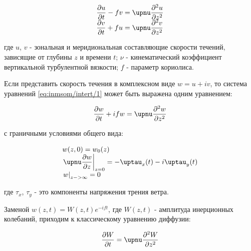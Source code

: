 \begin{equation} \label{eq:inmsom/intert/1} 
  \begin{array}{l}
  \displaystyle{ \d{u}{t} - fv = \nu \dd{u}{z} } \\ 
  \displaystyle{ \d{v}{t} + fu = \nu \dd{v}{z} } \\
  \end{array}
\end{equation}

где $u$, $v$ - зональная и меридиональная составляющие скорости течений, зависящие от глубины $z$ и времени $t$; $\nu$ - кинематический коэффициент вертикальной турбулентной вязкости; $f$ - параметр кориолиса. 

Если представить скорость течения в комплексном виде $w = u + iv $, то система уравнений \ref{eq:inmsom/intert/1} может быть выражена одним уравнением:

\begin{equation} \label{eq:inmsom/intert/2}
  \begin{array}{l}
  \displaystyle{  \d{w}{t} + ifw = \nu \dd{w}{z} } \\ 
  \end{array}
\end{equation}

с граничными условиями общего вида:

\begin{equation} \label{eq:inmsom/intert/3}
  \begin{array}{l}
  w(z, 0) = w_0(z) \\
  \displaystyle{ \left. \nu \d{w}{z} \right|_{z=0} = -\tau_x(t) -i\tau_y(t) } \\
  \displaystyle{ \left. w \right|_{z->\infty} = 0 } \\
  \end{array}
\end{equation}

где $\tau_x$, $\tau_y$ - это компоненты напряжения трения ветра.


Заменой $w(z,t) = W(z,t) e^{-ift}$, где $W(z,t)$ - амплитуда инерционных колебаний, приходим к классическому уравнению диффузии:

\begin{equation} \label{eq:inmsom/intert/4}
  \begin{array}{l}
  \displaystyle{ \d{W}{t} = \nu \dd{W}{z} } \\ 
  \end{array}
\end{equation}

